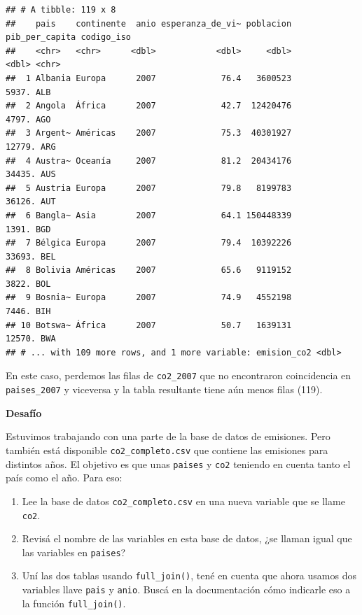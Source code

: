 \documentclass[
  openany]{book}
\providecommand{\tightlist}{%
  \setlength{\itemsep}{0pt}\setlength{\parskip}{0pt}}
\begin{document}
\begin{verbatim}
## # A tibble: 119 x 8
##    pais    continente  anio esperanza_de_vi~ poblacion pib_per_capita codigo_iso
##    <chr>   <chr>      <dbl>            <dbl>     <dbl>          <dbl> <chr>     
##  1 Albania Europa      2007             76.4   3600523          5937. ALB       
##  2 Angola  África      2007             42.7  12420476          4797. AGO       
##  3 Argent~ Américas    2007             75.3  40301927         12779. ARG       
##  4 Austra~ Oceanía     2007             81.2  20434176         34435. AUS       
##  5 Austria Europa      2007             79.8   8199783         36126. AUT       
##  6 Bangla~ Asia        2007             64.1 150448339          1391. BGD       
##  7 Bélgica Europa      2007             79.4  10392226         33693. BEL       
##  8 Bolivia Américas    2007             65.6   9119152          3822. BOL       
##  9 Bosnia~ Europa      2007             74.9   4552198          7446. BIH       
## 10 Botswa~ África      2007             50.7   1639131         12570. BWA       
## # ... with 109 more rows, and 1 more variable: emision_co2 <dbl>
\end{verbatim}

En este caso, perdemos las filas de \texttt{co2\_2007} que no encontraron coincidencia en \texttt{paises\_2007} y viceversa y la tabla resultante tiene aún menos filas (119).

\textbf{Desafío}

Estuvimos trabajando con una parte de la base de datos de emisiones.
Pero también está disponible \texttt{co2\_completo.csv} que contiene las emisiones para distintos años.
El objetivo es que unas \texttt{paises} y \texttt{co2} teniendo en cuenta tanto el país como el año.
Para eso:

\begin{enumerate}
\def\labelenumi{\arabic{enumi}.}
\tightlist
\item
  Lee la base de datos \texttt{co2\_completo.csv} en una nueva variable que se llame \texttt{co2}.
\item
  Revisá el nombre de las variables en esta base de datos, ¿se llaman igual que las variables en \texttt{paises}?
\item
  Uní las dos tablas usando \texttt{full\_join()}, tené en cuenta que ahora usamos dos variables llave \texttt{pais} y \texttt{anio}. Buscá en la documentación cómo indicarle eso a la función \texttt{full\_join()}.\\
\end{enumerate}
\end{document}

